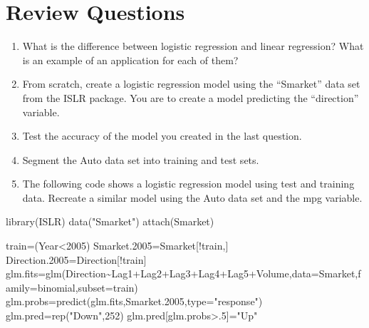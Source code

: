 \documentclass[
]{book}
\newenvironment{Shaded}{\begin{snugshade}}{\end{snugshade}}
\newcommand{\AttributeTok}[1]{\textcolor[rgb]{0.77,0.63,0.00}{#1}}
\newcommand{\DecValTok}[1]{\textcolor[rgb]{0.00,0.00,0.81}{#1}}
\newcommand{\FloatTok}[1]{\textcolor[rgb]{0.00,0.00,0.81}{#1}}
\newcommand{\FunctionTok}[1]{\textcolor[rgb]{0.00,0.00,0.00}{#1}}
\newcommand{\NormalTok}[1]{#1}
\newcommand{\OtherTok}[1]{\textcolor[rgb]{0.56,0.35,0.01}{#1}}
\newcommand{\SpecialCharTok}[1]{\textcolor[rgb]{0.00,0.00,0.00}{#1}}
\newcommand{\StringTok}[1]{\textcolor[rgb]{0.31,0.60,0.02}{#1}}
\begin{document}
\hypertarget{review-questions-2}{%
\section{Review Questions}\label{review-questions-2}}

\begin{enumerate}
\def\labelenumi{\arabic{enumi})}
\item
  What is the difference between logistic regression and linear regression? What is an example of an application for each of them?
\item
  From scratch, create a logistic regression model using the ``Smarket'' data set from the ISLR package. You are to create a model predicting the ``direction'' variable.
\item
  Test the accuracy of the model you created in the last question.
\item
  Segment the Auto data set into training and test sets.
\item
  The following code shows a logistic regression model using test and training data. Recreate a similar model using the Auto data set and the mpg variable.
\end{enumerate}

\begin{Shaded}
\begin{Highlighting}[]
\FunctionTok{library}\NormalTok{(ISLR)}
\FunctionTok{data}\NormalTok{(}\StringTok{"Smarket"}\NormalTok{)}
\FunctionTok{attach}\NormalTok{(Smarket)}

\NormalTok{train}\OtherTok{=}\NormalTok{(Year}\SpecialCharTok{\textless{}}\DecValTok{2005}\NormalTok{)}
\NormalTok{Smarket}\FloatTok{.2005}\OtherTok{=}\NormalTok{Smarket[}\SpecialCharTok{!}\NormalTok{train,]}
\NormalTok{Direction}\FloatTok{.2005}\OtherTok{=}\NormalTok{Direction[}\SpecialCharTok{!}\NormalTok{train]}
\NormalTok{glm.fits}\OtherTok{=}\FunctionTok{glm}\NormalTok{(Direction}\SpecialCharTok{\textasciitilde{}}\NormalTok{Lag1}\SpecialCharTok{+}\NormalTok{Lag2}\SpecialCharTok{+}\NormalTok{Lag3}\SpecialCharTok{+}\NormalTok{Lag4}\SpecialCharTok{+}\NormalTok{Lag5}\SpecialCharTok{+}\NormalTok{Volume,}\AttributeTok{data=}\NormalTok{Smarket,}\AttributeTok{family=}\NormalTok{binomial,}\AttributeTok{subset=}\NormalTok{train)}
\NormalTok{glm.probs}\OtherTok{=}\FunctionTok{predict}\NormalTok{(glm.fits,Smarket}\FloatTok{.2005}\NormalTok{,}\AttributeTok{type=}\StringTok{"response"}\NormalTok{)}
\NormalTok{glm.pred}\OtherTok{=}\FunctionTok{rep}\NormalTok{(}\StringTok{"Down"}\NormalTok{,}\DecValTok{252}\NormalTok{)}
\NormalTok{glm.pred[glm.probs}\SpecialCharTok{\textgreater{}}\NormalTok{.}\DecValTok{5}\NormalTok{]}\OtherTok{=}\StringTok{"Up"}
\end{Highlighting}
\end{Shaded}


  
\end{document}
